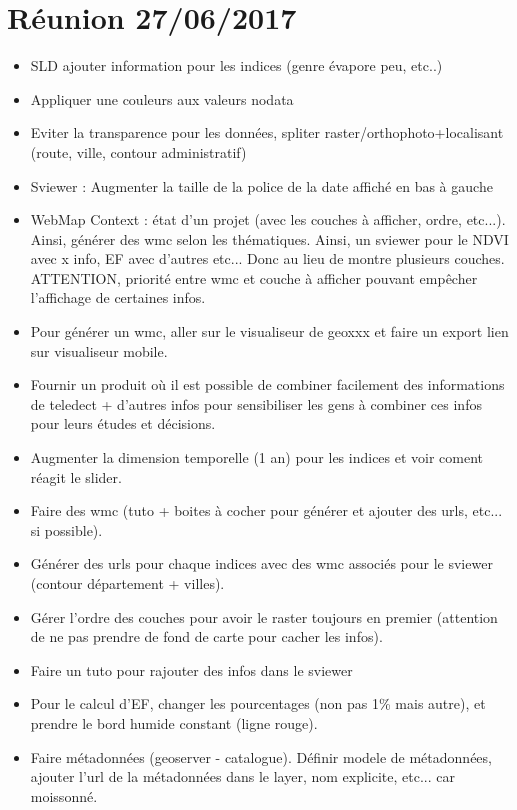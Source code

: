 \documentclass[10pt,a4paper]{article}
\begin{document}
\section{Réunion 27/06/2017}
\begin{itemize}
\item SLD ajouter information pour les indices (genre évapore peu, etc..)
\item Appliquer une couleurs aux valeurs nodata
\item Eviter la transparence pour les données, spliter raster/orthophoto+localisant (route, ville, contour administratif)
\item Sviewer : Augmenter la taille de la police de la date affiché en bas à gauche
\item WebMap Context : état d'un projet (avec les couches à afficher, ordre, etc...). Ainsi, générer des wmc selon les thématiques. Ainsi, un sviewer pour le NDVI avec x info, EF avec d'autres etc... Donc au lieu de montre plusieurs couches. ATTENTION, priorité entre wmc et couche à afficher pouvant empêcher l'affichage de certaines infos.
\item Pour générer un wmc, aller sur le visualiseur de geoxxx et faire un export lien sur visualiseur mobile.
\item Fournir un produit où il est possible de combiner facilement des informations de teledect + d'autres infos pour sensibiliser les gens à combiner ces infos pour leurs études et décisions.
\end{itemize}
\begin{itemize}
\item Augmenter la dimension temporelle (1 an) pour les indices et voir coment réagit le slider.
\item Faire des wmc (tuto + boites à cocher pour générer et ajouter des urls, etc... si possible).
\item Générer des urls pour chaque indices avec des wmc associés pour le sviewer (contour département + villes).
\item Gérer l'ordre des couches pour avoir le raster toujours en premier (attention de ne pas prendre de fond de carte pour cacher les infos).
\item Faire un tuto pour rajouter des infos dans le sviewer 
\item Pour le calcul d'EF, changer les pourcentages (non pas 1\% mais autre), et prendre le bord humide constant (ligne rouge).
\item Faire métadonnées (geoserver - catalogue). Définir modele de métadonnées, ajouter l'url de la métadonnées dans le layer, nom explicite, etc... car moissonné.
\end{itemize}
\end{document}
